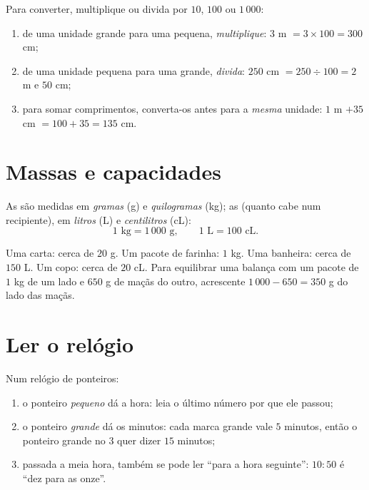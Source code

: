 \begin{method}\label{met:g3:measure:convert}
Para converter, multiplique ou divida por $10$, $100$ ou $1\,000$:
\begin{enumerate}
  \item de uma unidade grande para uma pequena, \emph{multiplique}:
        $3$ m $= 3 \times 100 = 300$ cm;
  \item de uma unidade pequena para uma grande, \emph{divida}:
        $250$ cm $= 250 \div 100 = 2$ m e $50$ cm;
  \item para somar comprimentos, converta-os antes para a
        \emph{mesma} unidade: $1$ m $+ 35$ cm $= 100 + 35 = 135$ cm.
\end{enumerate}
\end{method}

\section{Massas e capacidades}

\begin{definition}\label{def:g3:measure:mass}
As  são medidas em \emph{gramas} (g) e \emph{quilogramas}
(kg); as  (quanto cabe num recipiente), em \emph{litros}
(L) e \emph{centilitros} (cL):
\[
1 \text{ kg} = 1\,000 \text{ g},
\qquad
1 \text{ L} = 100 \text{ cL}.
\]
\end{definition}

\begin{example}\label{ex:g3:measure:mass}
Uma carta: cerca de $20$ g. Um pacote de farinha: $1$ kg. Uma
banheira: cerca de $150$ L. Um copo: cerca de $20$ cL. Para
equilibrar uma balança com um pacote de $1$ kg de um lado e $650$ g
de maçãs do outro, acrescente $1\,000 - 650 = 350$ g do lado das
maçãs.
\end{example}

\section{Ler o relógio}

\begin{method}\label{met:g3:measure:clock}
Num relógio de ponteiros:
\begin{enumerate}
  \item o ponteiro \emph{pequeno} dá a hora: leia o último número por
        que ele passou;
  \item o ponteiro \emph{grande} dá os minutos: cada marca grande vale
        $5$ minutos, então o ponteiro grande no $3$ quer dizer $15$
        minutos;
  \item passada a meia hora, também se pode ler ``para a hora
        seguinte'': $10{:}50$ é ``dez para as onze''.
\end{enumerate}
\end{method}

